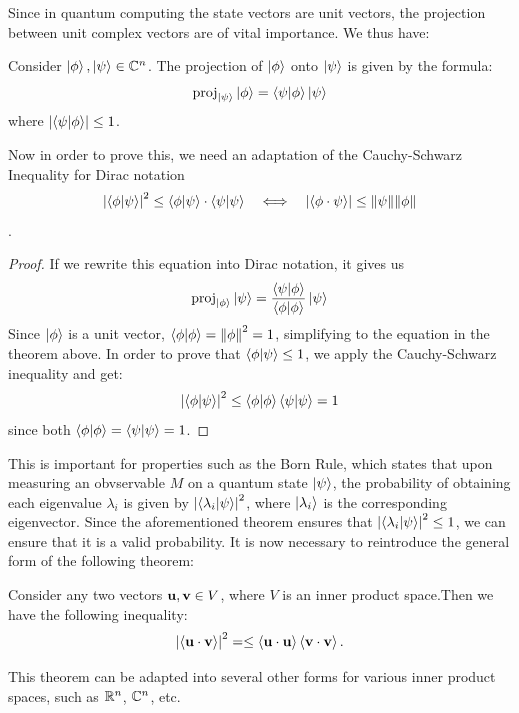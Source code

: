 \documentclass[12pt]{article}
\begin{document}
Since in quantum computing the state vectors are unit vectors, the projection between unit complex vectors are of vital importance. We thus have:

\begin{theorem}
    Consider $\ket{\phi}, \ket{\psi} \in \mathbb{C}^n$. The projection of $\ket{\phi}$ onto $\ket{\psi}$ is given by the formula:
    $$\text{proj}_{\ket{\psi}} \ket{\phi} = \braket{\psi}{\phi} \ket{\psi}$$
    where $\abs{\braket{\psi}{\phi}} \leq 1$.
\end{theorem}

Now in order to prove this, we need an adaptation of the Cauchy-Schwarz Inequality for Dirac notation$$\abs{\braket{\phi}{\psi}}^2 \leq \braket{\phi}{\psi} \cdot \braket{\psi}{\psi} \quad \Longleftrightarrow \quad \abs{\left\langle\phi \cdot \psi \right\rangle} \leq \norm{\psi} \norm{\phi}$$.


\begin{proof}
    If we rewrite this equation into Dirac notation, it gives us 
    $$\text{proj}_{\ket{\phi}} \ket{\psi} = \frac{\braket{\psi}{\phi}}{\braket{\phi}{\phi}} \ket{\psi}$$
    Since $\ket{\phi}$ is a unit vector, $\braket{\phi}{\phi} = \norm{\phi}^2 = 1$, simplifying to the equation in the theorem above. 
    In order to prove that $\braket{\phi}{\psi} \leq 1$, we apply the Cauchy-Schwarz inequality and get:
    $$\abs{\braket{\phi}{\psi}}^2 \leq \braket{\phi}{\phi} \braket{\psi}{\psi} = 1$$
    since both $\braket{\phi}{\phi} = \braket{\psi}{\psi} = 1$.
\end{proof}

This is important for properties such as the Born Rule, which states that upon measuring an obvservable $M$ on a quantum state $\ket{\psi}$, the probability of obtaining each eigenvalue $\lambda_i$ is given by $\abs{\braket{\lambda_i}{\psi}}^2$, where $\ket{\lambda_i}$ is the corresponding eigenvector. Since the aforementioned theorem ensures that $\abs{\braket{\lambda_i}{\psi}}^2 \leq 1$, we can ensure that it is a valid probability. It is now necessary to reintroduce the general form of the following theorem:

\begin{theorem}
    Consider any two vectors $\mathbf{u}, \mathbf{v} \in V$, where $V$ is an inner product space.Then we have the following inequality:
    $$\abs{\left\langle\mathbf{u} \cdot \mathbf{v} \right\rangle}^2 = \leq \left\langle\mathbf{u} \cdot \mathbf{u} \right\rangle \left\langle\mathbf{v} \cdot \mathbf{v} \right\rangle.$$ 
\end{theorem}

This theorem can be adapted into several other forms for various inner product spaces, such as $\mathbb{R}^n$, $\mathbb{C}^n$, etc. 
\end{document}
